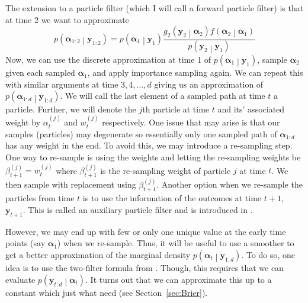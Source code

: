 \documentclass[notitlepage]{article}
\renewcommand{\vec}[1]{\bm{#1}}
\newcommand{\Lparen}[1]{\left( #1\right)}
\newcommand{\Cond}[2]{ #1 \middle\vert  #2}
\newcommand{\optor}[2]{#1\Lparen{#2}}
\newcommand{\optorC}[3]{\optor{#1}{\Cond{#2}{#3}}}
\newcommand{\pdensC}[2]{\optorC{p}{#1}{#2}}
\newcommand{\partic}[3]{#1_{#2}^{\Lparen{#3}}}
\newcommand{\nPeriods}{d}
\begin{document}
The extension to a particle filter (which I will call a forward particle filter) is that at 
time 2 we want to approximate %
%
$$
\pdensC{\vec\alpha_{1:2}}{\vec y_{1:2}} = 
	\pdensC{\vec\alpha_1}{\vec y_1}\frac{
		\optorC{g_2}{\vec y_2}{\vec\alpha_2}\optorC{f}{\vec\alpha_2}{\vec\alpha_1}
	}{
		\pdensC{\vec y_2}{\vec y_1}
	}
$$%
% 
Now, we can use the discrete approximation at time 1 of $\pdensC{\vec\alpha_1}{\vec y_1}$, 
sample $\vec \alpha_2$ given each sampled $\vec\alpha_1$, and apply importance sampling 
again. We can repeat this with similar arguments at time $3,4,\dots,\nPeriods$ giving us an approximation 
of $\pdensC{\vec\alpha_{1:\nPeriods}}{\vec y_{1:\nPeriods}}$. We will call the last element of 
a sampled path at time $t$ a particle. Further, we will denote the $j$th particle at time $t$ 
and its' associated weight by $\partic\alpha tj$ and $\partic wtj$ respectively.  
One issue that may arise is that 
our samples (particles) may degenerate so essentially only one sampled path of $\vec\alpha_{1:\nPeriods}$ 
has any weight in the end. 
To avoid this, we may introduce a re-sampling step. One way to re-sample is using the weights 
and letting the re-sampling weights be $\partic\beta{t+1}j = \partic wtj$ where $\partic\beta{t+1}j$ is 
the re-sampling weight of particle $j$ at time $t$. We then sample with replacement using 
$\partic\beta{t+1}j$. Another option when we re-sample the particles from time 
$t$ is to use the information of the outcomes at time $t+1$, $\vec y_{t+1}$. This is called 
an auxiliary particle filter and is introduced in \cite{pitt99}.

However, we may end up with few or only one unique value at the early time 
points (say $\vec\alpha_1$) when we re-sample. Thus, it will be useful to use a smoother to get 
a better approximation of the marginal density $\pdensC{\vec\alpha_t}{\vec y_{1:\nPeriods}}$. To do so, 
one idea is to use the two-filter formula from \cite{kitagawa94}. Though, this requires that
we can evaluate $\pdensC{\vec{y}_{t:d}}{\vec{\alpha}_t}$. It turns out that we can approximate 
this up to a constant which just what need (see Section~\ref{sec:Brier}). 
\end{document}
